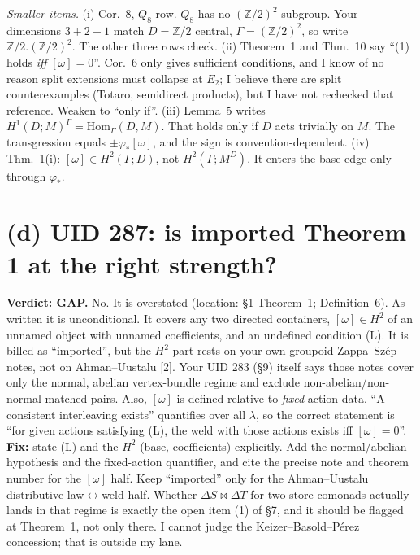 \documentclass[11pt]{article}
\newcommand{\Hom}{\mathrm{Hom}}
\newcommand{\verdict}[1]{\textbf{Verdict: #1.}}
\begin{document}
\emph{Smaller items.}
(i) Cor.~8, $Q_8$ row. $Q_8$ has no $(\mathbb Z/2)^2$ subgroup. Your dimensions $3+2+1$ match $D=\mathbb Z/2$ central,
$\Gamma=(\mathbb Z/2)^2$, so write $\mathbb Z/2.(\mathbb Z/2)^2$. The other three rows check.
(ii) Theorem~1 and Thm.~10 say ``(1) holds \emph{iff} $[\omega]=0$''. Cor.~6 only gives sufficient conditions, and I know of no reason
split extensions must collapse at $E_2$; I believe there are split counterexamples (Totaro, semidirect products), but I have not rechecked that reference. Weaken to ``only if''.
(iii) Lemma~5 writes $H^1(D;M)^\Gamma=\Hom_\Gamma(D,M)$. That holds only if $D$ acts trivially on $M$. The
transgression equals $\pm\varphi_*[\omega]$, and the sign is convention-dependent.
(iv) Thm.~1(i): $[\omega]\in H^2(\Gamma;D)$, not $H^2(\Gamma;M^D)$. It enters the base edge only through $\varphi_*$.

\section*{(d) UID 287: is imported Theorem 1 at the right strength?}

\verdict{GAP} No. It is overstated (location: \S1 Theorem~1; Definition~6). As written it is unconditional. It
covers any two directed containers, $[\omega]\in H^2$ of an unnamed object with unnamed coefficients, and an
undefined condition (L). It is billed as ``imported'', but the $H^2$ part rests on your own groupoid Zappa--Sz\'ep
notes, not on Ahman--Uustalu [2]. Your UID 283 (\S9) itself says those notes cover only the normal, abelian
vertex-bundle regime and exclude non-abelian/non-normal matched pairs. Also, $[\omega]$ is defined relative to
\emph{fixed} action data. ``A consistent interleaving exists'' quantifies over all $\lambda$, so the correct statement
is ``for given actions satisfying (L), the weld with those actions exists iff $[\omega]=0$''. \textbf{Fix:} state (L)
and the $H^2$ (base, coefficients) explicitly. Add the normal/abelian hypothesis and the fixed-action
quantifier, and cite the precise note and theorem number for the $[\omega]$ half. Keep ``imported'' only for the
Ahman--Uustalu distributive-law$\leftrightarrow$weld half. Whether $\Delta S\bowtie\Delta T$ for two store comonads
actually lands in that regime is exactly the open item (1) of \S7, and it should be flagged at Theorem~1, not only
there. I cannot judge the Keizer--Basold--P\'erez concession; that is outside my lane.
\end{document}
